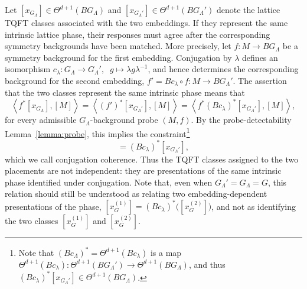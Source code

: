 \documentclass[aps,prx,reprint,superscriptaddress,twocolumn,amsmath,amssymb,amsfonts, nofootinbib]{revtex4-2}
\theoremstyle{apsstyle}
\begin{document}
Let $[x_{G_{\Lambda}}]\in\Theta^{d+1}(BG_{\Lambda})$ and $[x_{G_{\Lambda}'}]\in\Theta^{d+1}(BG_{\Lambda}')$ denote the lattice TQFT classes associated with the two embeddings. If they represent the same intrinsic lattice phase, their responses must agree after the corresponding symmetry backgrounds have been matched. More precisely, let $f:M\rightarrow BG_{\Lambda}$ be a symmetry background for the first embedding. Conjugation by $\lambda$ defines an isomorphism $c_{\lambda}:G_{\Lambda}\rightarrow G_{\Lambda}', \;\; g\mapsto \lambda g\lambda^{-1}$, and hence determines the corresponding background for the second embedding, $f' = Bc_{\lambda}\circ f: M\to BG_{\Lambda}'$. The assertion that the two classes represent the same intrinsic phase means that 
\begin{equation*} 
\left\langle f^{*}[x_{G_{\Lambda}}],[M] \right\rangle = \left\langle (f')^{*}[x_{G_{\Lambda}'}],[M] \right\rangle = \left\langle f^{*}(Bc_{\lambda})^{*}[x_{G_{\Lambda}'}],[M] \right\rangle, \end{equation*} 
for every admissible $G_{\Lambda}$-background probe $(M,f)$. By the probe-detectability Lemma~\ref{lemma:probe}, this implies the constraint\footnote{Note that $(Bc_{\Lambda})^{*}=\Theta^{d+1}(Bc_{\lambda})$ is a map $\Theta^{d+1}(Bc_{\lambda}): \Theta^{d+1}(BG_{\Lambda}')\to \Theta^{d+1}(BG_{\Lambda})$, and thus $(Bc_{\lambda})^{*}[x_{G_{\Lambda}'}]\in \Theta^{d+1}(BG_{\Lambda})$.} 
\begin{equation*} 
[x_{G_{\Lambda}}] = (Bc_{\lambda})^{*}[x_{G_{\Lambda}'}], 
\end{equation*} 
which we call conjugation coherence. Thus the TQFT classes assigned to the two placements are not independent: they are presentations of the same intrinsic phase identified under conjugation. Note that, even when $G_{\Lambda}'=G_{\Lambda}=G$, this relation should still be understood as relating two embedding-dependent presentations of the phase, $[x_{G}^{(1)}] = (Bc_{\lambda})^{*}\bigl([x_{G}^{(2)}]\bigr)$, and not as identifying the two classes $[x_{G}^{(1)}]$ and $[x_{G}^{(2)}]$.

\bigskip
\end{document}
